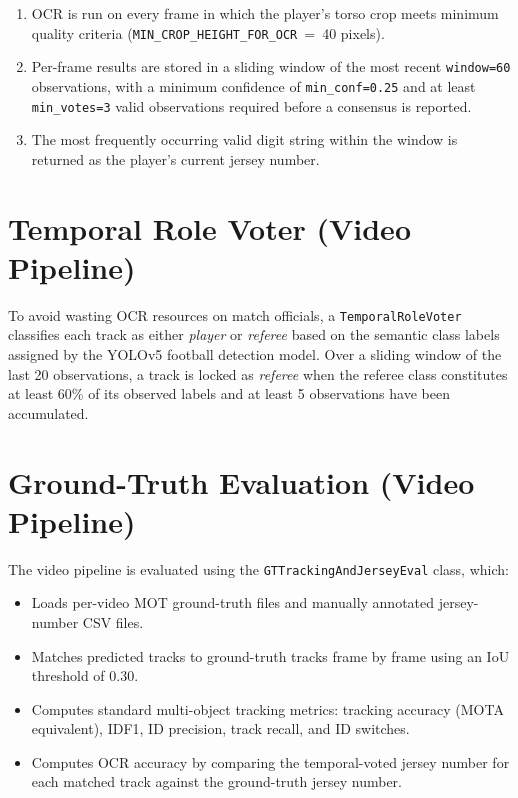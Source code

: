\begin{enumerate}
    \item OCR is run on every frame in which the player's torso crop
    meets minimum quality criteria (\mbox{\texttt{MIN\_CROP\_HEIGHT\_FOR\_OCR}
    = 40} pixels).
    \item Per-frame results are stored in a sliding window of the most
    recent \texttt{window=60} observations, with a minimum confidence
    of \texttt{min\-\_conf=0.25} and at least \texttt{min\-\_votes=3} valid
    observations required before a consensus is reported.
    \item The most frequently occurring valid digit string within the
    window is returned as the player's current jersey number.
\end{enumerate}

\section{Temporal Role Voter (Video Pipeline)}

To avoid wasting OCR resources on match officials, a
\texttt{Temporal\-Role\-Voter} classifies each track as either
\textit{player} or \textit{referee} based on the semantic class labels
assigned by the YOLOv5 football detection model. Over a sliding window
of the last 20 observations, a track is locked as \textit{referee} when
the referee class constitutes at least 60\% of its observed labels and
at least 5 observations have been accumulated.

\section{Ground-Truth Evaluation (Video Pipeline)}
\label{sec:gt-eval}

The video pipeline is evaluated using the
\texttt{GT\-Tracking\-And\-Jersey\-Eval} class, which:

\begin{itemize}[noitemsep]
    \item Loads per-video MOT ground-truth files and manually annotated
    jersey-number CSV files.
    \item Matches predicted tracks to ground-truth tracks frame by frame
    using an IoU threshold of 0.30.
    \item Computes standard multi-object tracking metrics: tracking
    accuracy (MOTA equivalent), IDF1, ID precision, track recall, and
    ID switches.
    \item Computes OCR accuracy by comparing the temporal-voted jersey
    number for each matched track against the ground-truth jersey number.
\end{itemize}

